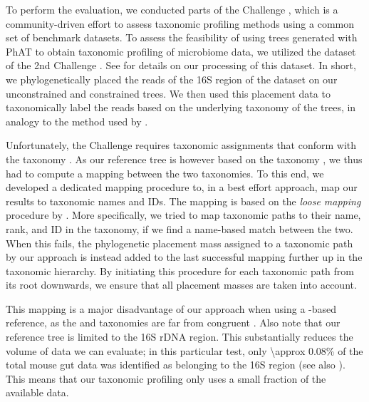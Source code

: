 To perform the evaluation, we conducted parts of the  Challenge \cite{Sczyrba2017},
which is a community-driven effort to assess taxonomic profiling methods using a common set of benchmark datasets.
To assess the feasibility of using trees generated with \ac{PhAT} to obtain taxonomic profiling of microbiome data,
we utilized the  dataset of the 2nd  Challenge \cite{Bremges2018}.
See  for details on our processing of this dataset.
In short, we phylogenetically placed the reads of the 16S region of the dataset
on our unconstrained and constrained  trees.
We then used this placement data to taxonomically label the reads
based on the underlying  taxonomy of the trees,
in analogy to the method used by  \cite{Kozlov2016}.

Unfortunately, the  Challenge requires taxonomic assignments
that conform with the  taxonomy \cite{Sayers2009,Benson2009}.
As our reference tree is however based on the  taxonomy \cite{Yilmaz2014},
we thus had to compute a mapping between the two taxonomies. %
To this end, we developed a dedicated mapping procedure to, in a best effort approach,
map our results to  taxonomic names and IDs.
The mapping is based on the \textit{loose mapping} procedure by .
More specifically, we tried to map taxonomic paths to their name, rank, and ID in the  taxonomy,
if we find a name-based match between the two.
When this fails, the phylogenetic placement mass assigned to a taxonomic path by our approach
is instead added to the last successful mapping further up in the taxonomic hierarchy.
By initiating this procedure for each taxonomic path from its root downwards,
we ensure that all placement masses are taken into account.

This mapping is a major disadvantage of our approach when using a -based reference,
as the  and  taxonomies are far from congruent \cite{Balvociute2017}.
Also note that our reference tree is limited to the 16S rDNA region.
This substantially reduces the volume of data we can evaluate;
in this particular test, only \num{\approx 0.08}\% of the total mouse gut data was identified as belonging to the 16S region
(see also ).
This means that our taxonomic profiling only uses a small fraction of the available data.

